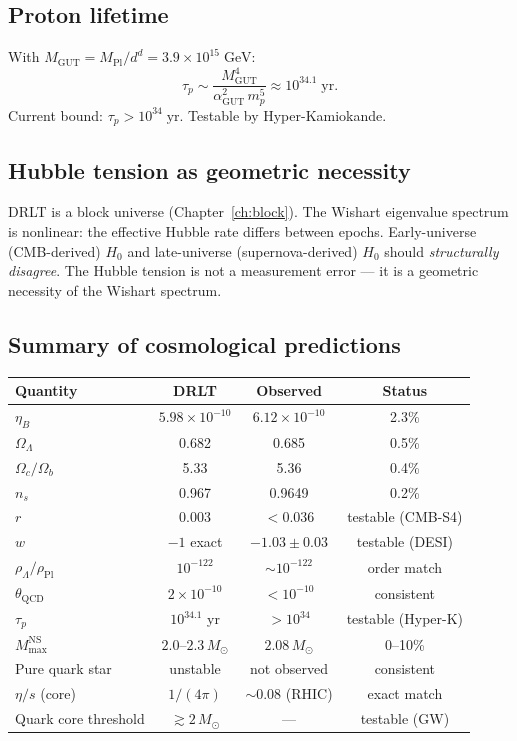 \documentclass[12pt]{article}
\theoremstyle{remark}
\theoremstyle{definition}
\begin{document}
\subsection{Proton lifetime}

With $M_\text{GUT} = M_\text{Pl}/d^d = 3.9 \times 10^{15}\;\text{GeV}$:
\begin{equation}
\tau_p \sim \frac{M_\text{GUT}^4}{\alpha_\text{GUT}^2\,m_p^5} \approx 10^{34.1}\;\text{yr}.
\end{equation}
Current bound: $\tau_p > 10^{34}\;\text{yr}$. Testable by Hyper-Kamiokande.

\subsection{Hubble tension as geometric necessity}

DRLT is a block universe (Chapter~\ref{ch:block}). The Wishart eigenvalue spectrum is nonlinear: the effective Hubble rate differs between epochs. Early-universe (CMB-derived) $H_0$ and late-universe (supernova-derived) $H_0$ should \emph{structurally disagree}. The Hubble tension is not a measurement error --- it is a geometric necessity of the Wishart spectrum.

\subsection{Summary of cosmological predictions}

\begin{center}
\begin{tabular}{lccc}
\hline
Quantity & DRLT & Observed & Status \\
\hline
$\eta_B$ & $5.98 \times 10^{-10}$ & $6.12 \times 10^{-10}$ & 2.3\% \\
$\Omega_\Lambda$ & 0.682 & 0.685 & 0.5\% \\
$\Omega_c/\Omega_b$ & 5.33 & 5.36 & 0.4\% \\
$n_s$ & 0.967 & 0.9649 & 0.2\% \\
$r$ & 0.003 & $< 0.036$ & testable (CMB-S4) \\
$w$ & $-1$ exact & $-1.03 \pm 0.03$ & testable (DESI) \\
$\rho_\Lambda/\rho_\text{Pl}$ & $10^{-122}$ & $\sim 10^{-122}$ & order match \\
$\theta_\text{QCD}$ & $2 \times 10^{-10}$ & $< 10^{-10}$ & consistent \\
$\tau_p$ & $10^{34.1}$ yr & $> 10^{34}$ & testable (Hyper-K) \\
$M_\text{max}^\text{NS}$ & $2.0$--$2.3\,M_\odot$ & $2.08\,M_\odot$ & 0--10\% \\
Pure quark star & unstable & not observed & consistent \\
$\eta/s$ (core) & $1/(4\pi)$ & $\sim 0.08$ (RHIC) & exact match \\
Quark core threshold & $\gtrsim 2\,M_\odot$ & --- & testable (GW) \\
\hline
\end{tabular}
\end{center}
\end{document}
